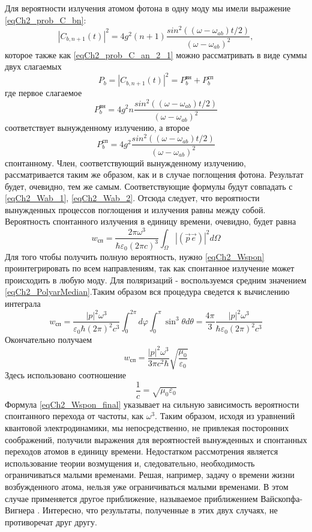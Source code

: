 Для вероятности излучения атомом фотона в одну моду мы имели выражение
\eqref{eqCh2_prob_C_bn}:
\[
\left|C_{b, n + 1}\left(t\right)\right|^2 = 4 g^2 \left(n + 1\right)
\frac{sin^2\left(\left(\omega - \omega_{ab}\right)t/2\right)}
{\left(\omega - \omega_{ab}\right)^2},
\]
которое также как \eqref{eqCh2_prob_C_an_2_1} можно рассматривать в
виде суммы двух слагаемых
\[
P_b = \left|C_{b, n + 1}\left(t\right)\right|^2 =
P_b^{\mbox{вн}} + P_b^{\mbox{сп}}
\]
где первое слагаемое
\[
P_b^{\mbox{вн}} = 4 g^2 n
\frac{sin^2\left(\left(\omega - \omega_{ab}\right)t/2\right)}
{\left(\omega - \omega_{ab}\right)^2}
\]
соответствует вынужденному излучению, а
второе
\[
P_b^{\mbox{сп}} = 4 g^2 
\frac{sin^2\left(\left(\omega - \omega_{ab}\right)t/2\right)}
{\left(\omega - \omega_{ab}\right)^2}
\]
спонтанному. Член, соответствующий вынужденному
излучению, рассматривается таким же образом, как и в случае поглощения
фотона. Результат будет, очевидно, тем же самым. Соответствующие
формулы будут совпадать с \eqref{eqCh2_Wab_1}, 
\eqref{eqCh2_Wab_2}. Отсюда следует, что вероятности
вынужденных процессов поглощения и излучения равны между
собой. Вероятность спонтанного излучения в единицу времени, очевидно, 
будет равна 
\begin{equation}
w_{\mbox{сп}} = 
\frac{2 \pi \omega^3}
{\hbar \varepsilon_0 \left(2 \pi c\right)^3}
\int_{\Omega}
\left|\left(\vec{p} \vec{e}\right)\right|^2
d \Omega
\label{eqCh2_Wspon}
\end{equation}
Для того чтобы получить полную вероятность, нужно \eqref{eqCh2_Wspon}
проинтегрировать по всем направлениям, так как спонтанное излучение
может происходить в любую моду. Для поляризаций - воспользуемся
средним значением \eqref{eqCh2_PolyarMedian}.Таким образом вся
процедура сведется к вычислению интеграла 
\begin{equation}
w_{\mbox{сп}} = 
\frac{\left|p\right|^2 \omega^3}
{\varepsilon_0 \hbar \left(2 \pi\right)^2 c^3}
\int_{0}^{2 \pi}d \varphi \int_0^{\pi}
\sin^3 \theta d \theta
= 
\frac{4 \pi}{3}\frac{\left|p\right|^2 \omega^3}
{\hbar \varepsilon_0 \left(2 \pi\right)^2 c^3}
\end{equation}
Окончательно получаем
\begin{equation}
w_{\mbox{сп}} = 
\frac{\left|p\right|^2 \omega^3}
{3 \pi c^2 \hbar}
\sqrt{\frac{\mu_0}{\varepsilon_0}}
\label{eqCh2_Wspon_final}
\end{equation}
Здесь использовано соотношение  
\[
\frac{1}{c} = \sqrt{\mu_0 \varepsilon_0}
\]
Формула \eqref{eqCh2_Wspon_final} указывает на сильную
зависимость вероятности спонтанного перехода от частоты, как  
$\omega^3$.  Таким
образом, исходя из уравнений квантовой электродинамики, мы
непосредственно, не привлекая посторонних соображений, получили
выражения для вероятностей вынужденных и спонтанных переходов атомов в
единицу времени. Недостатком рассмотрения является использование
теории возмущения и, следовательно, необходимость ограничиваться
малыми временами. Решая, например, задачу о времени жизни
возбужденного атома, нельзя уже ограничиваться малыми временами. В
этом случае применяется другое приближение, называемое приближением
Вайскопфа-Вигнера \cite{bLuisell1972}. Интересно, что результаты,
полученные в этих двух случаях, не противоречат друг другу.  

